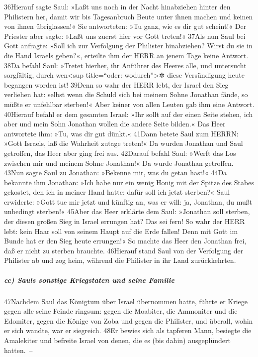 36Hierauf sagte Saul: »Laßt uns noch in der Nacht hinabziehen hinter den
Philistern her, damit wir bis Tagesanbruch Beute unter ihnen machen und
keinen von ihnen übriglassen!« Sie antworteten: »Tu ganz, wie es dir gut
scheint!« Der Priester aber sagte: »Laßt uns zuerst hier vor Gott
treten!« 37Als nun Saul bei Gott anfragte: »Soll ich zur Verfolgung der
Philister hinabziehen? Wirst du sie in die Hand Israels geben?«,
erteilte ihm der HERR an jenem Tage keine Antwort. 38Da befahl Saul:
»Tretet hierher, ihr Anführer des Heeres alle, und untersucht
sorgfältig, durch wen\textless sup title=``oder: wodurch''\textgreater✲
diese Versündigung heute begangen worden ist! 39Denn so wahr der HERR
lebt, der Israel den Sieg verliehen hat: selbst wenn die Schuld sich bei
meinem Sohne Jonathan fände, so müßte er unfehlbar sterben!« Aber keiner
von allen Leuten gab ihm eine Antwort. 40Hierauf befahl er dem gesamten
Israel: »Ihr sollt auf der einen Seite stehen, ich aber und mein Sohn
Jonathan wollen die andere Seite bilden.« Das Heer antwortete ihm: »Tu,
was dir gut dünkt.« 41Dann betete Saul zum HERRN: »Gott Israels, laß die
Wahrheit zutage treten!« Da wurden Jonathan und Saul getroffen, das Heer
aber ging frei aus. 42Darauf befahl Saul: »Werft das Los zwischen mir
und meinem Sohne Jonathan!« Da wurde Jonathan getroffen. 43Nun sagte
Saul zu Jonathan: »Bekenne mir, was du getan hast!« 44Da bekannte ihm
Jonathan: »Ich habe nur ein wenig Honig mit der Spitze des Stabes
gekostet, den ich in meiner Hand hatte: dafür soll ich jetzt sterben?«
Saul erwiderte: »Gott tue mir jetzt und künftig an, was er will: ja,
Jonathan, du mußt unbedingt sterben!« 45Aber das Heer erklärte dem Saul:
»Jonathan soll sterben, der diesen großen Sieg in Israel errungen hat?
Das sei fern! So wahr der HERR lebt: kein Haar soll von seinem Haupt auf
die Erde fallen! Denn mit Gott im Bunde hat er den Sieg heute errungen!«
So machte das Heer den Jonathan frei, daß er nicht zu sterben brauchte.
46Hierauf stand Saul von der Verfolgung der Philister ab und zog heim,
während die Philister in ihr Land zurückkehrten.

\hypertarget{cc-sauls-sonstige-kriegstaten-und-seine-familie}{%
\subparagraph{cc) Sauls sonstige Kriegstaten und seine
Familie}\label{cc-sauls-sonstige-kriegstaten-und-seine-familie}}

47Nachdem Saul das Königtum über Israel übernommen hatte, führte er
Kriege gegen alle seine Feinde ringsum: gegen die Moabiter, die
Ammoniter und die Edomiter, gegen die Könige von Zoba und gegen die
Philister, und überall, wohin er sich wandte, war er siegreich. 48Er
bewies sich als tapferen Mann, besiegte die Amalekiter und befreite
Israel von denen, die es (bis dahin) ausgeplündert hatten.~--

